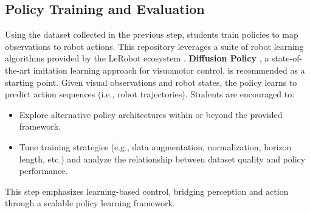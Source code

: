 \documentclass[11pt]{article}
\begin{document}
\subsection{Policy Training and Evaluation}
\label{sec:policies-concept}

% 

Using the dataset collected in the previous step, students train policies to map observations to robot actions. This repository leverages a suite of robot learning algorithms provided by the LeRobot ecosystem \cite{lerobot_ecosystem}. \textbf{Diffusion Policy} \cite{chi2023diffusionpolicy}, a state-of-the-art imitation learning \cite{wiki_imitation_learning} approach for visuomotor control, is recommended as a starting point. Given visual observations and robot states, the policy learns to predict action sequences (i.e., robot trajectories). Students are encouraged to:
\begin{itemize}
  \item Explore alternative policy architectures within or beyond the provided framework.
  \item Tune training strategies (e.g., data augmentation, normalization, horizon length, etc.) and analyze the relationship between dataset quality and policy performance.
\end{itemize}
This step emphasizes learning-based control, bridging perception and action through a scalable policy learning framework.
\end{document}
